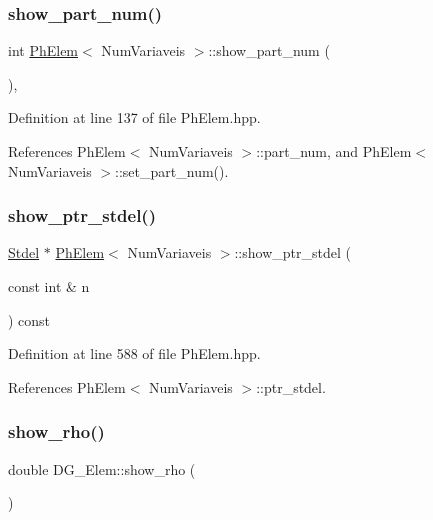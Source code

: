 \subsubsection{\texorpdfstring{show\+\_\+part\+\_\+num()}{show\_part\_num()}}
{\footnotesize\ttfamily int \hyperlink{classPhElem}{Ph\+Elem}$<$ Num\+Variaveis $>$\+::show\+\_\+part\+\_\+num (\begin{DoxyParamCaption}{ }\end{DoxyParamCaption})\hspace{0.3cm}{\ttfamily [inline]}, {\ttfamily [inherited]}}



Definition at line 137 of file Ph\+Elem.\+hpp.



References Ph\+Elem$<$ Num\+Variaveis $>$\+::part\+\_\+num, and Ph\+Elem$<$ Num\+Variaveis $>$\+::set\+\_\+part\+\_\+num().

\mbox{\label{classPhElem_a227c31195c6832f8e36f8d507806bd54}} 
\subsubsection{\texorpdfstring{show\+\_\+ptr\+\_\+stdel()}{show\_ptr\_stdel()}}
{\footnotesize\ttfamily \hyperlink{classStdel}{Stdel} $\ast$ \hyperlink{classPhElem}{Ph\+Elem}$<$ Num\+Variaveis $>$\+::show\+\_\+ptr\+\_\+stdel (\begin{DoxyParamCaption}\item[{const int \&}]{n }\end{DoxyParamCaption}) const\hspace{0.3cm}{\ttfamily [inherited]}}



Definition at line 588 of file Ph\+Elem.\+hpp.



References Ph\+Elem$<$ Num\+Variaveis $>$\+::ptr\+\_\+stdel.

\mbox{\label{classDG__Elem_acc7285f0df1d6a4544405169daf2853c}} 
\subsubsection{\texorpdfstring{show\+\_\+rho()}{show\_rho()}}
{\footnotesize\ttfamily double D\+G\+\_\+\+Elem\+::show\+\_\+rho (\begin{DoxyParamCaption}{ }\end{DoxyParamCaption})\hspace{0.3cm}{\ttfamily [inline]}}



